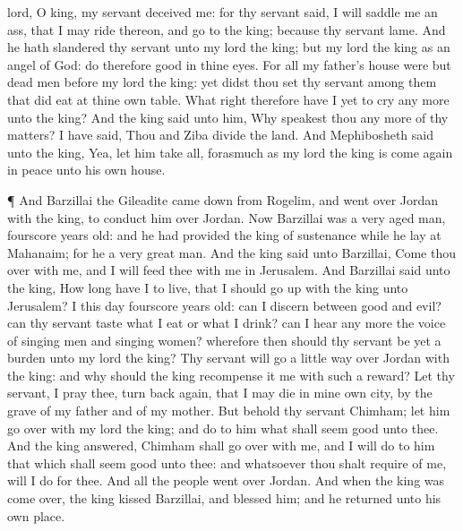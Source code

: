 {lord, O
king, my
servant
deceived me: for thy
servant
said, I will
saddle me an
ass, that I may
ride thereon, and
go to the
king; because thy
servant
{}
lame.
And he hath
slandered thy
servant unto my
lord the
king; but my
lord the
king
{} as an
angel of
God:
do therefore
{}
good in thine
eyes.
For all
{} my
father’s
house were
but
dead
men before my
lord the
king: yet didst thou
set thy
servant among them that did
eat at thine own
table. What
right therefore
have I yet to
cry any more unto the
king?
And the
king
said unto him, Why
speakest thou any more of thy
matters? I have
said, Thou and
Ziba
divide the
land.
And
Mephibosheth
said unto the
king, Yea, let him
take all,
forasmuch
as my
lord the
king is come
again in
peace unto his own
house.
\par }{\PP {}¶ And
Barzillai the
Gileadite came
down from
Rogelim, and went
over
Jordan with the
king, to
conduct him over
Jordan.
Now
Barzillai was a
very
aged man,
{}
fourscore
years
old: and he had provided the
king of
sustenance while he
lay at
Mahanaim; for he
{} a
very
great
man.
And the
king
said unto
Barzillai, Come thou
over with me, and I will
feed thee with me in
Jerusalem.
And
Barzillai
said unto the
king, How
long have I to
live, that I should go
up with the
king unto
Jerusalem?
I
{} this
day
fourscore
years
old:
{} can I
discern between
good and
evil? can thy
servant
taste
what I
eat or
what I
drink? can I
hear any more the
voice of singing
men and singing
women? wherefore then should thy
servant be yet a
burden unto my
lord the
king?
Thy
servant will
go a little
way
over
Jordan with the
king: and why should the
king
recompense it me with such a
reward?
Let thy
servant, I pray thee, turn back
again, that I may
die in mine own
city,
{} by the
grave of my
father and of my
mother. But behold thy
servant
Chimham; let him go
over with my
lord the
king; and
do to him what shall seem
good unto thee.
And the
king
answered,
Chimham shall
go over with me, and I will
do to him that which shall seem
good unto thee: and whatsoever thou shalt
require of me,
{} will I
do for thee.
And all the
people went
over
Jordan. And when the
king was come
over, the
king
kissed
Barzillai, and
blessed him; and he
returned unto his own
place.
}
